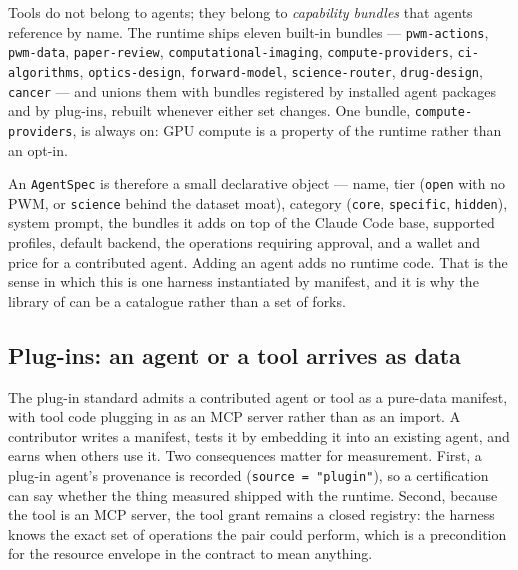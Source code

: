 \documentclass[11pt]{article}
\theoremstyle{definition}
\begin{document}
\begin{sloppypar}
Tools do not belong to agents; they belong to \emph{capability bundles} that agents reference by name. The runtime ships eleven built-in bundles --- \texttt{pwm-\allowbreak actions}, \texttt{pwm-\allowbreak data}, \texttt{paper-\allowbreak review}, \texttt{computational-\allowbreak imaging}, \texttt{compute-\allowbreak providers}, \texttt{ci-\allowbreak algorithms}, \texttt{optics-\allowbreak design}, \texttt{forward-\allowbreak model}, \allowbreak \texttt{science-\allowbreak router}, \texttt{drug-\allowbreak design}, \texttt{cancer} --- and unions them with bundles registered by installed agent packages and by plug-ins, rebuilt whenever either set changes. One bundle, \texttt{compute-\allowbreak providers}, is always on: GPU compute is a property of the runtime rather than an opt-in.
\end{sloppypar}

An \texttt{AgentSpec} is therefore a small declarative object --- name, tier (\texttt{open} with no PWM, or \texttt{science} behind the dataset moat), category (\texttt{core}, \texttt{specific}, \texttt{hidden}), system prompt, the bundles it adds on top of the Claude Code base, supported profiles, default backend, the operations requiring approval, and a wallet and price for a contributed agent. Adding an agent adds no runtime code. That is the sense in which this is one harness instantiated by manifest, and it is why the library of \citet{yang2026library} can be a catalogue rather than a set of forks.

\subsection{Plug-ins: an agent or a tool arrives as data}

The plug-in standard admits a contributed agent or tool as a pure-data manifest, with tool code plugging in as an MCP server rather than as an import. A contributor writes a manifest, tests it by embedding it into an existing agent, and earns when others use it. Two consequences matter for measurement. First, a plug-in agent's provenance is recorded (\texttt{source = "plugin"}), so a certification can say whether the thing measured shipped with the runtime. Second, because the tool is an MCP server, the tool grant remains a closed registry: the harness knows the exact set of operations the pair could perform, which is a precondition for the resource envelope in the contract to mean anything.
\end{document}
